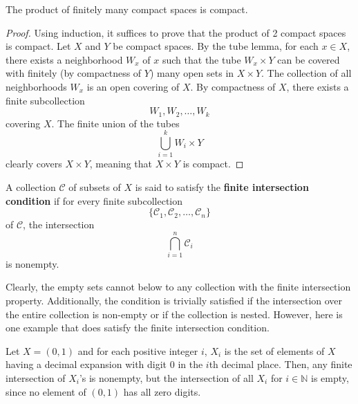     \begin{theorem}
      The product of finitely many compact spaces is compact. 
    \end{theorem}
    \begin{proof}
      Using induction, it suffices to prove that the product of 2 compact spaces is compact. Let $X$ and $Y$ be compact spaces. By the tube lemma, for each $x \in X$, there exists a neighborhood $W_x$ of $x$ such that the tube $W_x \times Y$ can be covered with finitely (by compactness of $Y$) many open sets in $X \times Y$. The collection of all neighborhoods $W_x$ is an open covering of $X$. By compactness of $X$, there exists a finite subcollection
      \begin{equation}
        W_1, W_2, \ldots , W_k
      \end{equation}
      covering $X$. The finite union of the tubes 
      \begin{equation}
        \bigcup_{i=1}^k W_i \times Y
      \end{equation}
      clearly covers $X \times Y$, meaning that $X \times Y$ is compact. 
    \end{proof}

    \begin{definition}
      A collection $\mathcal{C}$ of subsets of $X$ is said to satisfy the \textbf{finite intersection condition} if for every finite subcollection 
      \begin{equation}
        \{\mathcal{C}_1, \mathcal{C}_2, \ldots , \mathcal{C}_n\}
      \end{equation}
      of $\mathcal{C}$, the intersection
      \begin{equation}
        \bigcap_{i=1}^n \mathcal{C}_i
      \end{equation}
      is nonempty. 
    \end{definition}

    Clearly, the empty sets cannot below to any collection with the finite intersection property. Additionally, the condition is trivially satisfied if the intersection over the entire collection is non-empty or if the collection is nested. However, here is one example that does satisfy the finite intersection condition. 

    \begin{example}
      Let $X = (0,1)$ and for each positive integer $i$, $X_i$ is the set of elements of $X$ having a decimal expansion with digit $0$ in the $i$th decimal place. Then, any finite intersection of $X_i$'s is nonempty, but the intersection of all $X_i$ for $i \in \mathbb{N}$ is empty, since no element of $(0,1)$ has all zero digits. 
    \end{example}

